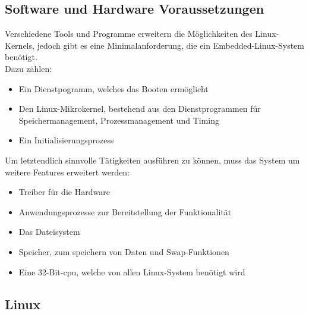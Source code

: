 \subsection{Software und Hardware Voraussetzungen}\label{kap:voraussetzungen}

Verschiedene Tools und Programme erweitern die Möglichkeiten des Linux-Kernels, jedoch gibt es eine Minimalanforderung, die ein Embedded-Linux-System benötigt.\\
Dazu zählen:\\
\begin{itemize}
  \item Ein Dienstpogramm, welches das Booten ermöglicht
  \item Den Linux-Mikrokernel, bestehend aus den Dienstprogrammen für Speichermanagement, Prozessmanagement und Timing
  \item Ein Initialisierungsprozess
\end{itemize}

Um letztendlich sinnvolle Tätigkeiten ausführen zu können, muss das System um weitere Features erweitert werden:\\
\begin{itemize}
  \item Treiber für die Hardware
  \item Anwendungsprozesse zur Bereitstellung der Funktionalität
  \item Das Dateisystem
  \item Speicher, zum speichern von Daten und Swap-Funktionen
  \item Eine 32-Bit-\ac{cpu}, welche von allen Linux-System benötigt wird
\end{itemize}


\subsection{Linux}\label{kap:linux}


